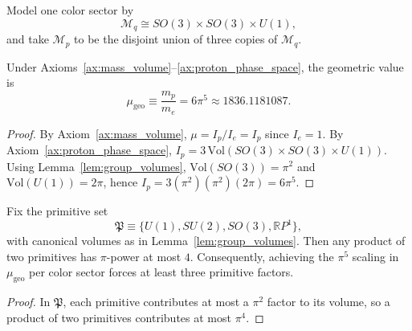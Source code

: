 \begin{axiom}
\label{ax:proton_phase_space}
Model one color sector by
\begin{equation}
    \mathcal{M}_q \cong SO(3)\times SO(3)\times U(1),
\end{equation}
and take $\mathcal{M}_p$ to be the disjoint union of three copies of $\mathcal{M}_q$.
\end{axiom}

\begin{theorem}
\label{thm:mu_geo}
Under Axioms~\ref{ax:mass_volume}--\ref{ax:proton_phase_space}, the geometric value is
\begin{equation}
    \mu_{\mathrm{geo}} \equiv \frac{m_p}{m_e} = 6\pi^5 \approx 1836.1181087.
\end{equation}
\end{theorem}
\begin{proof}
By Axiom~\ref{ax:mass_volume}, $\mu=I_p/I_e=I_p$ since $I_e=1$. By Axiom~\ref{ax:proton_phase_space},
$I_p=3\,\mathrm{Vol}(SO(3)\times SO(3)\times U(1))$.
Using Lemma~\ref{lem:group_volumes}, $\mathrm{Vol}(SO(3))=\pi^2$ and $\mathrm{Vol}(U(1))=2\pi$, hence
$I_p=3(\pi^2)(\pi^2)(2\pi)=6\pi^5$.
\end{proof}

\begin{proposition}
\label{prop:mu_min_factor_count}
Fix the primitive set
\begin{equation}
    \mathfrak{P}\equiv \{U(1),SU(2),SO(3),\mathbb{R}P^1\},
\end{equation}
with canonical volumes as in Lemma~\ref{lem:group_volumes}. Then any product of two primitives has $\pi$-power at most $4$. Consequently, achieving the $\pi^5$ scaling in $\mu_{\mathrm{geo}}$ per color sector forces at least three primitive factors.
\end{proposition}
\begin{proof}
In $\mathfrak{P}$, each primitive contributes at most a $\pi^2$ factor to its volume, so a product of two primitives contributes at most $\pi^4$.
\end{proof}

